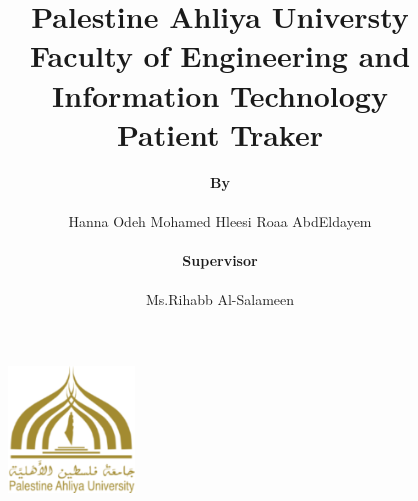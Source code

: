 \documentclass[12pt]{article}
\title{{\large \textbf{Palestine Ahliya Universty}
	\\
	\textbf{Faculty of Engineering and Information Technology}}\vspace{2cm}
	\\
	
	\textbf{{\Huge Patient Traker}}\vspace{1cm}}
\author{\textbf{By}
	\\\\
	Hanna Odeh\qquad \qquad \quad
	Mohamed Hleesi\qquad \quad
	Roaa AbdEldayem
	\\\\
	\textbf{Supervisor}
	\\\\
	Ms.Rihabb Al-Salameen
}
\date{}
\begin{document}
	
	\begin{figure}[!t]
		\centering
		\includegraphics[width=0.30\textwidth]{icon.png}
		\vspace{-1.5cm}
	\end{figure}

	\maketitle
	\thispagestyle{empty}
	
\end{document}
